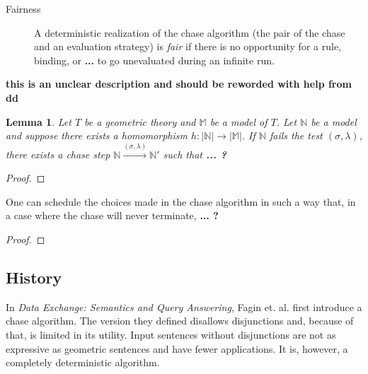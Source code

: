 		\label{fairness_definition}
		\begin{description}
		\item [Fairness] A deterministic realization of the chase algorithm
		(the pair of the chase and an evaluation strategy) is \emph{fair} if
		there is no opportunity for a rule, binding, or \textbf{...} to go
		unevaluated during an infinite run.
		\end{description}

		\textbf{this is an unclear description and should be reworded with help from dd}

		\newtheorem{chase_lemma}{Lemma}
		\begin{chase_lemma}
			Let $T$ be a geometric theory and $\mathbb{M}$ be a model of $T$.
			Let $\mathbb{N}$ be a model and suppose there exists a homomorphism
			$h : |\mathbb{N}| \to |\mathbb{M}|$. If $\mathbb{N}$ fails the test
			$(\sigma,\lambda)$, there exists a chase step $\mathbb{N}
			\xrightarrow{(\sigma,\lambda)} \mathbb{N}'$ such that \textbf{... ?}
		\end{chase_lemma}

		\begin{proof}
			
		\end{proof}

		\begin{theorem}
			One can schedule the choices made in the chase algorithm in such a
			way that, in a case where the chase will never terminate,
			\textbf{... ?}
		\end{theorem}

		\begin{proof}
			
		\end{proof}

	\subsection{History}

		In \cite{FKMP02} \emph{Data Exchange: Semantics and Query Answering},
		Fagin et. al. first introduce a chase algorithm. The version they
		defined disallows disjunctions and, because of that, is limited in its
		utility. Input sentences without disjunctions are not as expressive
		as geometric sentences and have fewer applications. It is, however, a
		completely deterministic algorithm.

